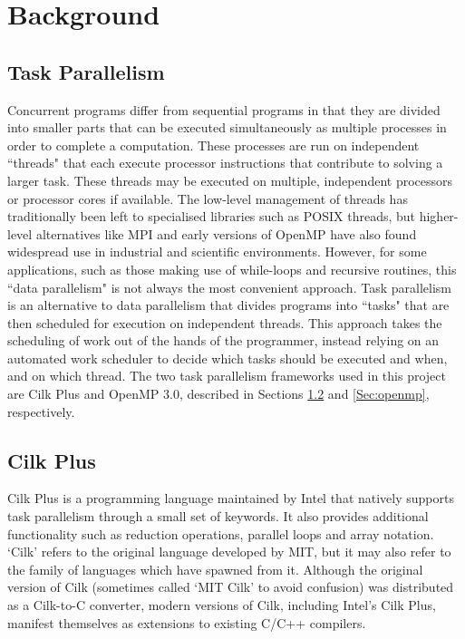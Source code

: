 \documentclass{report}
\begin{document}
\chapter{Background} \label{Sec:background}

\section{Task Parallelism} \label{Sec:taskparallelism}

Concurrent programs differ from sequential programs in that they are divided into smaller parts that can be executed simultaneously as multiple processes in order to complete a computation\cite{Andrews99}. These processes are run on independent ``threads" that each execute processor instructions that contribute to solving a larger task. These threads may be executed on multiple, independent processors or processor cores if available. The low-level management of threads has traditionally been left to specialised libraries such as POSIX threads\cite{pthreads}, but higher-level alternatives like MPI and early versions of OpenMP have also found widespread use in industrial and scientific environments\cite{Hwang98}. However, for some applications, such as those making use of while-loops and recursive routines, this ``data parallelism" is not always the most convenient approach\cite{Ayguade09}. Task parallelism is an alternative to data parallelism that divides programs into ``tasks" that are then scheduled for execution on independent threads. This approach takes the scheduling of work out of the hands of the programmer, instead relying on an automated work scheduler to decide which tasks should be executed and when, and on which thread\cite{Ayguade09}. The two task parallelism frameworks used in this project are Cilk Plus and OpenMP 3.0\cite{Podobas15}, described in Sections \ref{Sec:cilkplus} and \ref{Sec:openmp}, respectively.

\section{Cilk Plus} \label{Sec:cilkplus}
     	
Cilk Plus is a programming language maintained by Intel that natively supports task parallelism through a small set of keywords. It also provides additional functionality such as reduction operations, parallel loops and array notation. `Cilk' refers to the original language developed by MIT, but it may also refer to the family of languages which have spawned from it. Although the original version of Cilk (sometimes called `MIT Cilk' to avoid confusion) was distributed as a Cilk-to-C converter, modern versions of Cilk, including Intel's Cilk Plus, manifest themselves as extensions to existing C/C++ compilers.
\end{document}
